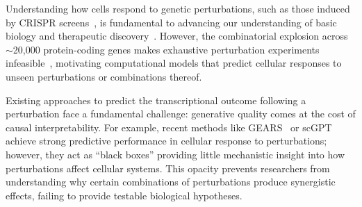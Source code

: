 \documentclass{article}
\begin{document}

Understanding how cells respond to genetic perturbations, such as those induced by CRISPR screens~\citep{dixit2016perturb}, is fundamental to advancing our understanding of basic biology and therapeutic discovery~\citep{plenge2013validating,adamson2016multiplexed,norman2019exploring}. 
However, the combinatorial explosion across $\sim$20,000 protein-coding genes makes exhaustive perturbation experiments infeasible~\citep{norman2019exploring}, motivating computational models that predict cellular responses to unseen perturbations or combinations thereof.

Existing approaches to predict the transcriptional outcome following a perturbation face a fundamental challenge: generative quality comes at the cost of causal interpretability.
For example, recent methods like GEARS~\citep{roohani2022gears} or scGPT~\citep{cui2024scgpt} achieve strong predictive performance in cellular response to perturbations; however, they act as ``black boxes'' providing little mechanistic insight into how perturbations affect cellular systems.
This opacity prevents researchers from understanding why certain combinations of perturbations produce synergistic effects, failing to provide testable biological hypotheses.
\end{document}
